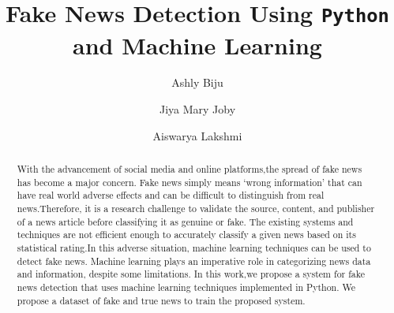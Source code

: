 \documentclass{josis}
\begin{document}


\title{Fake News Detection Using {\texttt{Python}} and Machine Learning}

\author{Ashly Biju}
\author{Jiya Mary Joby }
\author{Aiswarya Lakshmi}
\date{}
\maketitle
\begin{abstract}
With the advancement of social media and online platforms,the spread of fake news has become a major concern. Fake news simply means `wrong information’ that can have real world adverse effects and can be difficult to distinguish from real news.Therefore, it is a research challenge to validate the source, content, and publisher of a news article before classifying it as genuine or fake. The existing systems and techniques are not efficient enough to accurately classify a given news based on its statistical rating.In this adverse situation, machine learning techniques can be used to detect fake news. Machine learning plays an imperative role in categorizing news data and information, despite some limitations. In this work,we propose a system for fake news detection that uses machine learning techniques implemented in Python. We propose a dataset of fake and true news to train the proposed system. 
\end{abstract}
\end{document}
